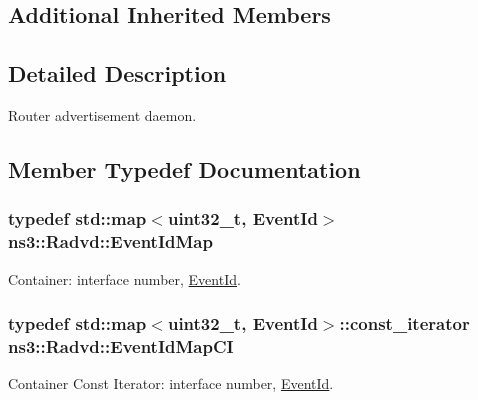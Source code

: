 \subsection*{Additional Inherited Members}


\subsection{Detailed Description}
Router advertisement daemon. 

\subsection{Member Typedef Documentation}
\subsubsection[{\texorpdfstring{Event\+Id\+Map}{EventIdMap}}]{\setlength{\rightskip}{0pt plus 5cm}typedef std\+::map$<$uint32\+\_\+t, {\bf Event\+Id}$>$ {\bf ns3\+::\+Radvd\+::\+Event\+Id\+Map}\hspace{0.3cm}{\ttfamily [private]}}\hypertarget{classns3_1_1Radvd_a0632ec911bbb504e6adfdb0cb39b3d21}{}\label{classns3_1_1Radvd_a0632ec911bbb504e6adfdb0cb39b3d21}


Container\+: interface number, \hyperlink{classns3_1_1EventId}{Event\+Id}. 

\subsubsection[{\texorpdfstring{Event\+Id\+Map\+CI}{EventIdMapCI}}]{\setlength{\rightskip}{0pt plus 5cm}typedef std\+::map$<$uint32\+\_\+t, {\bf Event\+Id}$>$\+::const\+\_\+iterator {\bf ns3\+::\+Radvd\+::\+Event\+Id\+Map\+CI}\hspace{0.3cm}{\ttfamily [private]}}\hypertarget{classns3_1_1Radvd_a199bf82edbd1366ed0d430a093478075}{}\label{classns3_1_1Radvd_a199bf82edbd1366ed0d430a093478075}


Container Const Iterator\+: interface number, \hyperlink{classns3_1_1EventId}{Event\+Id}. 

